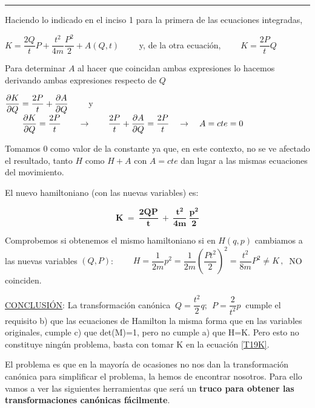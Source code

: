 \begin{flushright}\rule{200pt}{0.1pt}\end{flushright}

Haciendo lo indicado en el inciso 1 para la primera de las ecuaciones integradas,

$K=\dfrac{2Q}{t}P + \dfrac{t^2}{4m}\dfrac{P^2}{2}+ A(Q,t) \qquad $ y, de la otra ecuación, $\qquad K=\dfrac{2P}{t}Q$

Para determinar $A$ al hacer que coincidan ambas expresiones lo hacemos derivando ambas expresiones respecto de $Q$

$\displaystyle \pdv{K}{Q} = \dfrac {2P}{t}+\pdv{A}{Q} \qquad $  y $\qquad \displaystyle \pdv{K}{Q}= \dfrac{2P}{t}  \qquad \to \qquad \dfrac {2P}{t}+\pdv{A}{Q} = \dfrac {2P}{t} \quad \to \quad A=cte=0$

Tomamos $0$ como valor de la constante ya que, en este contexto, no se ve afectado el resultado, tanto $H$ como $H+A$ con $A=cte$ dan lugar a las mismas ecuaciones del movimiento.

El nuevo hamiltoniano (con las nuevas variables) es:

\begin{equation}
\label{T19K}
	\boldsymbol {K \ = \ \dfrac{2QP}t \ + \  \dfrac{t^2}{4m} \ \dfrac{p^2}2 }	
\end{equation}


\vspace{5mm}  Comprobemos si obtenemos el mismo hamiltoniano si en $H(q,p)$ cambiamos a las nuevas variables $(Q,P)$:
 $\qquad H=\dfrac{1}{2m} p^2=\dfrac 1{2m} \left( \dfrac{Pt^2}{2} \right)^2 = \dfrac{t^2}{8m}P^2 \neq K\, , \ $  NO coinciden.
 
 
 \vspace{5mm} \underline{CONCLUSIÓN}:  La transformación canónica  $\ Q=\dfrac {t^2} 2 q ;\ \ P=\dfrac 2 {t^2} p \ $ cumple el requisito b) que las ecuaciones de Hamilton la misma forma que en las variables originales, cumple c) que det(M)=1, pero no cumple a) que H=K. Pero esto no constituye ningún problema, basta con tomar K en la ecuación \ref{T19K}.
 
 El problema es que en la mayoría de ocasiones no nos dan la transformación canónica para simplificar el problema, la hemos de encontrar nosotros. Para ello vamos a ver las siguientes herramientas que será un \textbf{truco para obtener las transformaciones canónicas fácilmente}.
 
 
